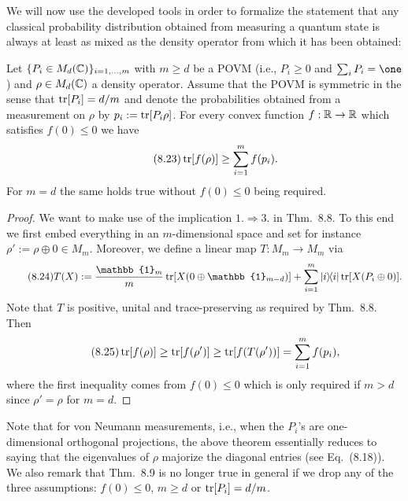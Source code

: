 \documentclass[11pt,a4paper]{article}
\theoremstyle{plain}
\theoremstyle{definition}
\theoremstyle{remark}
\begin{document}
We will now use the developed tools in order to formalize the statement
that any classical probability distribution obtained from measuring a quantum
state is always at least as mixed as the density operator from which it has been
obtained:

\begin{theorem}
    Let $\{P_i\in M_d(\mathbb{C})\}_{i=1,\dots,m}$ with $m\ge d$ be a POVM (i.e., $P_i\ge 0$ and $\sum_i P_i=\one$)
    and $\rho\in M_d(\mathbb{C})$ a density operator. Assume that the POVM is symmetric
    in the sense that $\operatorname{tr}[P_i]=d/m$ and denote the probabilities obtained from a
    measurement on $\rho$ by $p_i:=\operatorname{tr}[P_i\rho]$. For every convex function $f:\mathbb{R}\to\mathbb{R}$
    which satisfies $f(0)\le 0$ we have
    \begin{equation}\tag{8.23}
        \operatorname{tr}[f(\rho)] \ge \sum_{i=1}^m f(p_i).
    \end{equation}
    For $m=d$ the same holds true without $f(0)\le 0$ being required.
\end{theorem}

\begin{proof}
    We want to make use of the implication $1.\Rightarrow 3$. in Thm.~8.8. To this
    end we first embed everything in an $m$-dimensional space and set for instance
    $\rho' := \rho\oplus 0\in M_m$. Moreover, we define a linear map $T:M_m\to M_m$ via
    \begin{equation}\tag{8.24}
        T(X) := \frac{\mathbb{1}_m}{m}\tr[X(0\oplus \mathbb{1}_{m-d})]
        +\sum_{i=1}^m \ketbra{i}{i} \tr[X(P_i\oplus 0)].
    \end{equation}
    Note that $T$ is positive, unital and trace-preserving as required by Thm.~8.8. Then
    \begin{equation}\tag{8.25}
        \operatorname{tr}[f(\rho)] \ge \operatorname{tr}[f(\rho')] \ge \operatorname{tr}[f(T(\rho'))] = \sum_{i=1}^m f(p_i),
    \end{equation}
    where the first inequality comes from $f(0)\le 0$ which is only required if $m>d$
    since $\rho'=\rho$ for $m=d$.
\end{proof}

Note that for von Neumann measurements, i.e., when the $P_i$'s are one-dimensional orthogonal projections, the above theorem essentially reduces to
saying that the eigenvalues of $\rho$ majorize the diagonal entries (see Eq.~(8.18)).
We also remark that Thm.~8.9 is no longer true in general if we drop any of the
three assumptions: $f(0)\le 0$, $m\ge d$ or $\operatorname{tr}[P_i]=d/m$.
\end{document}
